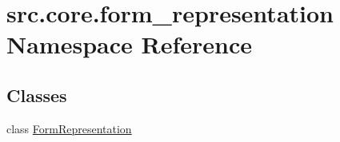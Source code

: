 \hypertarget{namespacesrc_1_1core_1_1form__representation}{\section{src.\+core.\+form\+\_\+representation Namespace Reference}
\label{namespacesrc_1_1core_1_1form__representation}
}
\subsection*{Classes}
\begin{DoxyCompactItemize}
\item 
class \hyperlink{classsrc_1_1core_1_1form__representation_1_1_form_representation}{Form\+Representation}
\end{DoxyCompactItemize}
